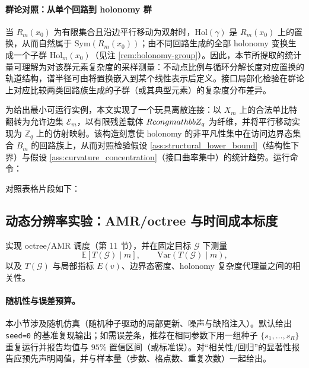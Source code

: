 \paragraph{群论对照：从单个回路到 holonomy 群}
当 $R_m(x_0)$ 为有限集合且沿边平行移动为双射时，$\mathrm{Hol}(\gamma)$ 是 $R_m(x_0)$ 上的置换，从而自然属于 $\mathrm{Sym}(R_m(x_0))$；由不同回路生成的全部 holonomy 变换生成一个子群 $\mathrm{Hol}_m(x_0)$（见注 \ref{rem:holonomy-group}）。因此，本节所提取的统计量可理解为对该群元素复杂度的采样测量：不动点比例与循环分解长度对应置换的轨道结构，谱半径可由将置换嵌入到某个线性表示后定义。接口局部化检验在群论上对应比较两类回路族生成的子群（或其典型元素）的复杂度分布差异。

为给出最小可运行实例，本文实现了一个玩具离散连接：以 $X_m$ 上的合法单比特翻转为允许边集 $\mathcal E_m$，以有限残差载体 $R\\cong\\mathbb Z_q$ 为纤维，并将平行移动实现为 $\mathbb Z_q$ 上的仿射映射。该构造刻意使 holonomy 的非平凡性集中在访问边界态集合 $B_m$ 的回路族上，从而对照检验假设 \ref{ass:structural_lower_bound}（结构性下界）与假设 \ref{ass:curvature_concentration}（接口曲率集中）的统计趋势。运行命令：
\begin{center}
\end{center}
对照表格片段如下：
\begin{center}

\end{center}

\subsection{动态分辨率实验：AMR/octree 与时间成本标度}

实现 octree/AMR 调度（第 11 节），并在固定目标 $\mathcal G$ 下测量
$$
\mathbb E[T(\mathcal G)\mid m],\qquad \mathrm{Var}(T(\mathcal G)\mid m),
$$
以及 $T(\mathcal G)$ 与局部指标 $E(v)$、边界态密度、holonomy 复杂度代理量之间的相关性。

\paragraph{随机性与误差预算。}
\AuditTag 本小节涉及随机仿真（随机种子驱动的局部更新、噪声与缺陷注入）。默认给出 \texttt{seed=0} 的基准复现输出；如需误差条，推荐在相同参数下用一组种子 $\{s_1,\dots,s_R\}$ 重复运行并报告均值与 $95\%$ 置信区间（或标准误）。对“相关性/回归”的显著性报告应预先声明阈值，并与样本量（步数、格点数、重复次数）一起给出。

